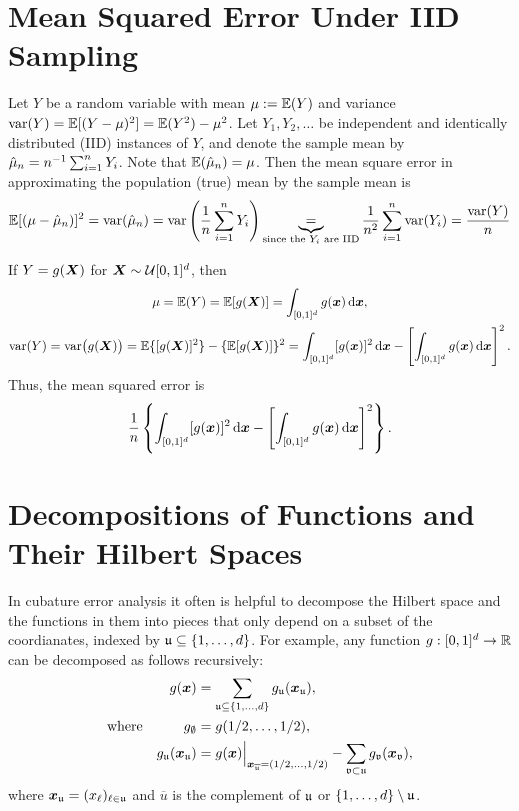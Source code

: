 \documentclass[letterpaper]{amsart}
\newcommand{\fv}{\mathfrak{v}}
\begin{document}
\section{Mean Squared Error Under IID Sampling} \label{app:MSE}
Let $Y$ be a random variable with mean $\mu :=  \operatorname{\mathbb{E}}(Y)$ and variance $\operatorname{var}(Y) = \operatorname{\mathbb{E}}[(Y - \mu)^2] = \operatorname{\mathbb{E}}(Y^2) - \mu^2$.  Let $Y_1, Y_2, \ldots$ be independent and identically distributed (IID) instances of $Y$, and denote the sample mean by $\hat{\mu}_n = n^{-1} \sum_{i=1}^n Y_i$.  Note that $\operatorname{\mathbb{E}}(\hat{\mu}_n) = \mu$.  Then the mean square error in approximating the population (true) mean by the sample mean is
\begin{equation*}
    \operatorname{\mathbb{E}}[(\mu - \hat{\mu}_n)]^2  =  \operatorname{var}(\hat{\mu}_n) = \operatorname{var} \left (\frac{1}{n} \sum_{i=1}^n Y_i \right) \underbrace{=}_{\text{since the $Y_i$ are IID}} \frac 1{n^2} \sum_{i=1}^n \operatorname{var}(Y_i) = \frac{\operatorname{var}(Y)}{n}
\end{equation*}

If $Y = g(\boldsymbol{X})$ for $\boldsymbol{X} \sim \mathcal{U}[0,1]^d$, then
\begin{gather*}
    \mu = \operatorname{\mathbb{E}}(Y) = \operatorname{\mathbb{E}}[g(\boldsymbol{X})]  = \int_{[0,1]^d} g(\boldsymbol{x}) \, {\rm d} \boldsymbol{x}, \\
    \operatorname{var}(Y) = \operatorname{var}\bigl(g(\boldsymbol{X})\bigr) = \operatorname{\mathbb{E}}\{[g(\boldsymbol{X})]^2\} - \{\operatorname{\mathbb{E}}[g(\boldsymbol{X})]\}^2 = \int_{[0,1]^d} [g(\boldsymbol{x})]^2  \, {\rm d} \boldsymbol{x} -
    \left[\int_{[0,1]^d} g(\boldsymbol{x}) \, {\rm d} \boldsymbol{x}\right]^2.
\end{gather*}
Thus, the mean squared error is
\[
\frac 1n  \left\{\int_{[0,1]^d} [g(\boldsymbol{x})]^2  \, {\rm d} \boldsymbol{x} -
    \left[\int_{[0,1]^d} g(\boldsymbol{x}) \, {\rm d} \boldsymbol{x}\right]^2 \right\}.
\]

\section{Decompositions of Functions and Their Hilbert Spaces} \label{sec:decomp}
In cubature error analysis it often is helpful to decompose the Hilbert space and the functions in them into pieces that only depend on a subset of the coordianates, indexed by $\mathfrak{u} \subseteq \{1, \ldots, d\}$.  For example, any function $g:[0,1]^d \to \mathbb{R}$ can be decomposed as follows recursively:
\begin{align*}
	&& g(\vx) & = \sum_{\fu \subseteq \{1, \ldots, d\}} g_\fu(\vx_\fu), \\
	&\text{where}& g_\emptyset &= g(1/2, \ldots, 1/2), \\
	&&g_{\fu}(\vx_\fu) &= g(\vx) \Bigr |_{\vx_{\overline{\fu}} = (1/2, \ldots, 1/2)} - \sum_{\fv \subset \fu} g_{\fv}(\vx_\fv),
\end{align*}
where $\boldsymbol{x}_{\mathfrak{u}} = (x_\ell)_{\ell \in \mathfrak{u}}$ and $\overline{u}$ is the complement of $\mathfrak{u}$ or $\{1, \ldots, d\} \setminus \mathfrak{u}$.
\end{document}
